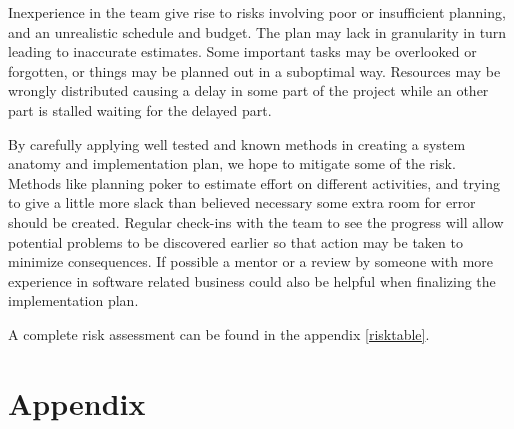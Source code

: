 \documentclass[titlepage]{article}
\begin{document}
Inexperience in the team give rise to risks involving poor or insufficient planning, and an unrealistic schedule and budget. The plan may lack in granularity in turn leading to inaccurate estimates. Some important tasks may be overlooked or forgotten, or things may be planned out in a suboptimal way. Resources may be wrongly distributed causing a delay in some part of the project while an other part is stalled waiting for the delayed part.

By carefully applying well tested and known methods in creating a system anatomy and implementation plan, we hope to mitigate some of the risk. Methods like planning poker to estimate effort on different activities, and trying to give a little more slack than believed necessary some extra room for error should be created. Regular check-ins with the team to see the progress will allow potential problems to be discovered earlier so that action may be taken to minimize consequences. If possible a mentor or a review by someone with more experience in software related business could also be helpful when finalizing the implementation plan.

A complete risk assessment can be found in the appendix \ref{risktable}.

\section{Appendix}
\end{document}
